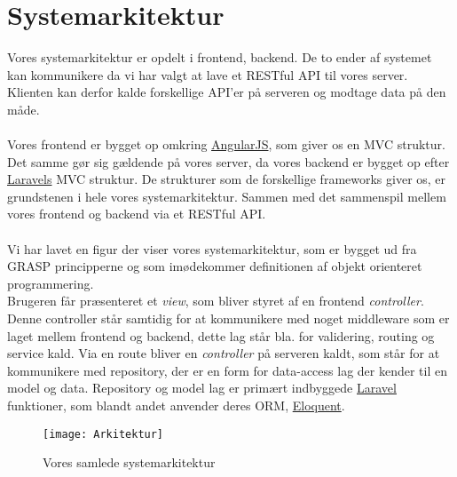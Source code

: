 \section{Systemarkitektur}
Vores systemarkitektur er opdelt i frontend, backend.
De to ender af systemet kan kommunikere da vi har valgt at lave et RESTful API til vores server.
Klienten kan derfor kalde forskellige API'er på serveren og modtage data på den måde.
\\\\
Vores frontend er bygget op omkring \hyperlink{AngularJS}{AngularJS}, som giver os en MVC struktur.
Det samme gør sig gældende på vores server, da vores backend er bygget op efter \hyperlink{Laravel}{Laravels} MVC struktur.
De strukturer som de forskellige frameworks giver os, er grundstenen i hele vores systemarkitektur. Sammen med det sammenspil mellem vores frontend og backend via et RESTful API.\@
\\\\
Vi har lavet en figur der viser vores systemarkitektur, som er bygget ud fra GRASP principperne og som imødekommer definitionen af objekt orienteret programmering.\\
Brugeren får præsenteret et \textit{view}, som bliver styret af en frontend \textit{controller}. Denne controller står samtidig for at kommunikere med noget middleware som er laget mellem frontend og backend, dette lag står bla. for validering, routing og service kald. Via en route bliver en \textit{controller} på serveren kaldt, som står for at kommunikere med repository, der er en form for data-access lag der kender til en model og data. Repository og model lag er primært indbyggede \hyperlink{Laravel}{Laravel} funktioner, som blandt andet anvender deres ORM, \href{http://laravel.com/docs/5.1/eloquent}{Eloquent}.
\begin{figure}[here]
\texttt{[image: Arkitektur]}
\caption{Vores samlede systemarkitektur}
\label{fig:arkitektur}
\end{figure}
